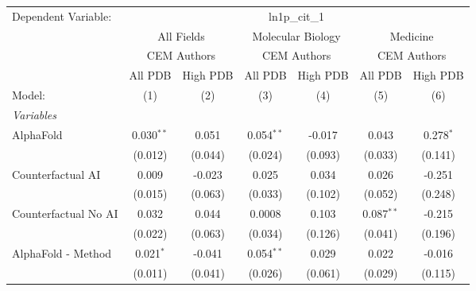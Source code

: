 \begingroup
\centering
\begin{tabular}{lcccccc}
   \tabularnewline \midrule \midrule
   Dependent Variable: & \multicolumn{6}{c}{ln1p\_cit\_1}\\
 & \multicolumn{2}{c}{All Fields} & \multicolumn{2}{c}{Molecular Biology} & \multicolumn{2}{c}{Medicine} \\
\cmidrule(lr){2-3} \cmidrule(lr){4-5} \cmidrule(lr){6-7}
 & \multicolumn{2}{c}{CEM Authors} & \multicolumn{2}{c}{CEM Authors} & \multicolumn{2}{c}{CEM Authors} \\
\cmidrule(lr){2-3} \cmidrule(lr){4-5} \cmidrule(lr){6-7}
 & \multicolumn{1}{c}{All PDB} & \multicolumn{1}{c}{High PDB} & \multicolumn{1}{c}{All PDB} & \multicolumn{1}{c}{High PDB} & \multicolumn{1}{c}{All PDB} & \multicolumn{1}{c}{High PDB} \\
\cmidrule(lr){2-2} \cmidrule(lr){3-3} \cmidrule(lr){4-4} \cmidrule(lr){5-5} \cmidrule(lr){6-6} \cmidrule(lr){7-7}
   Model:                                                     & (1)          & (2)     & (3)          & (4)     & (5)           & (6)\\  
   \midrule
   \emph{Variables}\\
   AlphaFold                                                  & 0.030$^{**}$ & 0.051   & 0.054$^{**}$ & -0.017  & 0.043         & 0.278$^{*}$\\   
                                                              & (0.012)      & (0.044) & (0.024)      & (0.093) & (0.033)       & (0.141)\\   
   Counterfactual AI                                          & 0.009        & -0.023  & 0.025        & 0.034   & 0.026         & -0.251\\   
                                                              & (0.015)      & (0.063) & (0.033)      & (0.102) & (0.052)       & (0.248)\\   
   Counterfactual No AI                                       & 0.032        & 0.044   & 0.0008       & 0.103   & 0.087$^{**}$  & -0.215\\   
                                                              & (0.022)      & (0.063) & (0.034)      & (0.126) & (0.041)       & (0.196)\\   
   AlphaFold - Method                                         & 0.021$^{*}$  & -0.041  & 0.054$^{**}$ & 0.029   & 0.022         & -0.016\\   
                                                              & (0.011)      & (0.041) & (0.026)      & (0.061) & (0.029)       & (0.115)\\   

\end{tabular}
